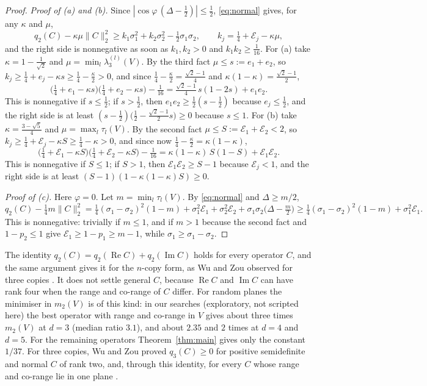 \documentclass[11pt]{article}
\theoremstyle{remark}
\newcommand{\norm}[1]{\lVert #1\rVert}
\begin{document}
\begin{proof}
\emph{Proof of (a) and (b).} Since $|\cos\varphi\,(\Delta-\frac12)|\le\frac12$, \eqref{eq:normal} gives, for any
$\kappa$ and $\mu$,
\[
q_2(C)-\kappa\mu\norm{C}_2^2\ge k_1\sigma_1^2+k_2\sigma_2^2-\tfrac12\sigma_1\sigma_2,\qquad
k_j=\tfrac14+\mathcal E_j-\kappa\mu ,
\]
and the right side is nonnegative as soon as $k_1,k_2>0$ and $k_1k_2\ge\frac1{16}$. For (a) take
$\kappa=1-\frac1{\sqrt2}$ and $\mu=\min_l\lambda_3^{(l)}(V)$. By the third fact $\mu\le s:=e_1+e_2$, so
$k_j\ge\frac14+e_j-\kappa s\ge\frac14-\frac\kappa2>0$, and since $\frac14-\frac\kappa2=\frac{\sqrt2-1}4$ and
$\kappa(1-\kappa)=\frac{\sqrt2-1}2$,
\[
\big(\tfrac14+e_1-\kappa s\big)\big(\tfrac14+e_2-\kappa s\big)-\tfrac1{16}=\tfrac{\sqrt2-1}4\,s(1-2s)+e_1e_2 .
\]
This is nonnegative if $s\le\frac12$; if $s>\frac12$, then $e_1e_2\ge\frac12(s-\frac12)$ because $e_j\le\frac12$, and
the right side is at least $(s-\frac12)\big(\frac12-\frac{\sqrt2-1}2s\big)\ge0$ because $s\le1$. For (b) take
$\kappa=\frac{3-\sqrt5}4$ and $\mu=\max_l\tau_l(V)$. By the second fact $\mu\le S:=\mathcal E_1+\mathcal E_2<2$, so
$k_j\ge\frac14+\mathcal E_j-\kappa S\ge\frac14-\kappa>0$, and since now $\frac14-\frac\kappa2=\kappa(1-\kappa)$,
\[
\big(\tfrac14+\mathcal E_1-\kappa S\big)\big(\tfrac14+\mathcal E_2-\kappa S\big)-\tfrac1{16}
=\kappa(1-\kappa)\,S(1-S)+\mathcal E_1\mathcal E_2 .
\]
This is nonnegative if $S\le1$; if $S>1$, then $\mathcal E_1\mathcal E_2\ge S-1$ because $\mathcal E_j<1$, and the right
side is at least $(S-1)(1-\kappa(1-\kappa)S)\ge0$.

\emph{Proof of (c).} Here $\varphi=0$. Let $m=\min_l\tau_l(V)$. By \eqref{eq:normal} and $\Delta\ge m/2$,
\[
q_2(C)-\tfrac14m\norm{C}_2^2=\tfrac14(\sigma_1-\sigma_2)^2(1-m)+\sigma_1^2\mathcal E_1+\sigma_2^2\mathcal E_2
+\sigma_1\sigma_2\big(\Delta-\tfrac m2\big)\ge\tfrac14(\sigma_1-\sigma_2)^2(1-m)+\sigma_1^2\mathcal E_1 .
\]
This is nonnegative: trivially if $m\le1$, and if $m>1$ because the second fact and $1-p_2\le1$ give
$\mathcal E_1\ge1-p_1\ge m-1$, while $\sigma_1\ge\sigma_1-\sigma_2$.
\end{proof}

The identity $q_2(C)=q_2(\operatorname{Re}C)+q_2(\operatorname{Im}C)$ holds for every operator $C$, and the same argument
gives it for the $n$-copy form, as Wu and Zou observed for three copies \cite{WuZou}. It does not settle general $C$, because $\operatorname{Re}C$ and $\operatorname{Im}C$ can
have rank four when the range and co-range of $C$ differ. For random planes the minimiser in $m_2(V)$ is of this kind:
in our searches (exploratory, not scripted here) the best operator with range and co-range in $V$ gives about three times $m_2(V)$ at $d=3$ (median
ratio $3.1$), and about $2.35$ and $2$ times at $d=4$ and $d=5$. For the remaining operators
Theorem~\ref{thm:main} gives only the constant $1/37$. For three copies, Wu and Zou proved $q_3(C)\ge0$ for positive
semidefinite and normal $C$ of rank two, and, through this identity, for every $C$ whose range and co-range lie in one
plane \cite[Cor.~6.2]{WuZou}.
\end{document}
